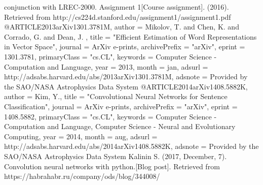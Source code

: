 \begin{thebibliography}
	 conjunction with LREC-2000.
	 {}
	  Assignment 1[Course assignment]. (2016). Retrieved from http://cs224d.stanford.edu/assignment1/assignment1.pdf 
	 {}
	    @ARTICLE{2013arXiv1301.3781M,
	 	author = {{Mikolov}, T. and {Chen}, K. and {Corrado}, G. and {Dean}, J.
	 	},
	 	title = "{Efficient Estimation of Word Representations in Vector Space}",
	 	journal = {ArXiv e-prints},
	 	archivePrefix = "arXiv",
	 	eprint = {1301.3781},
	 	primaryClass = "cs.CL",
	 	keywords = {Computer Science - Computation and Language},
	 	year = 2013,
	 	month = jan,
	 	adsurl = {http://adsabs.harvard.edu/abs/2013arXiv1301.3781M},
	 	adsnote = {Provided by the SAO/NASA Astrophysics Data System}
	 }	
		@ARTICLE{2014arXiv1408.5882K,
	 	author = {{Kim}, Y.},
	 	title = "{Convolutional Neural Networks for Sentence Classification}",
	 	journal = {ArXiv e-prints},
	 	archivePrefix = "arXiv",
	 	eprint = {1408.5882},
	 	primaryClass = "cs.CL",
	 	keywords = {Computer Science - Computation and Language, Computer Science - Neural and Evolutionary Computing},
	 	year = 2014,
	 	month = aug,
	 	adsurl = {http://adsabs.harvard.edu/abs/2014arXiv1408.5882K},
	 	adsnote = {Provided by the SAO/NASA Astrophysics Data System}
	 	}	
		Kalinin S. (2017, December, 7). Convolution neural networks with python.[Blog post]. Retrieved from https://habrahabr.ru/company/ods/blog/344008/
	 
\end{thebibliography}
